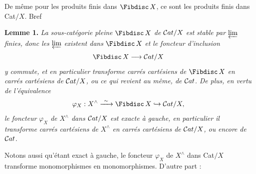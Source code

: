 De même pour les produits finis dans $\Fibdisc\, X$, ce sont les produits finis dans Cat$/X$. Bref

\textbf{Lemme 1.} \textit{La sous-catégorie pleine} $\Fibdisc\, X$ \textit{de} $\mathcal{C}at/X$ \textit{est stable par} $\varprojlim$ \textit{finies, donc les} $\varprojlim$ \textit{existent dans} $\Fibdisc\, X$ \textit{et le foncteur d'inclusion}
\[
\Fibdisc\, X \longrightarrow \Cat/X
\]
\textit{y commute, et en particulier transforme carrés cartésiens de} $\Fibdisc\, X$ \textit{en carrés cartésiens de} $\mathcal{C}at/X$\textit{, ou ce qui revient au même, de} $\mathcal{C}at$\textit{. De plus, en vertu de l'équivalence}
\[
\varphi_X : X^{\wedge} \xrightarrow{\ \sim\ } \Fibdisc\, X \hookrightarrow \Cat/X,
\]
\textit{le foncteur $\varphi_X$ de $X^{\wedge}$ dans} $\mathcal{C}at/X$ \textit{est exacte à gauche, en particulier il transforme carrés cartésiens de $X^{\wedge}$ en carrés cartésiens de} $\mathcal{C}at/X$\textit{, ou encore de} $\mathcal{C}at$\textit{.} %

Notons aussi qu'étant exact à gauche, le foncteur $\varphi_X$ de $X^{\wedge}$ dans Cat$/X$ transforme monomorphismes en monomorphismes. D'autre part :

